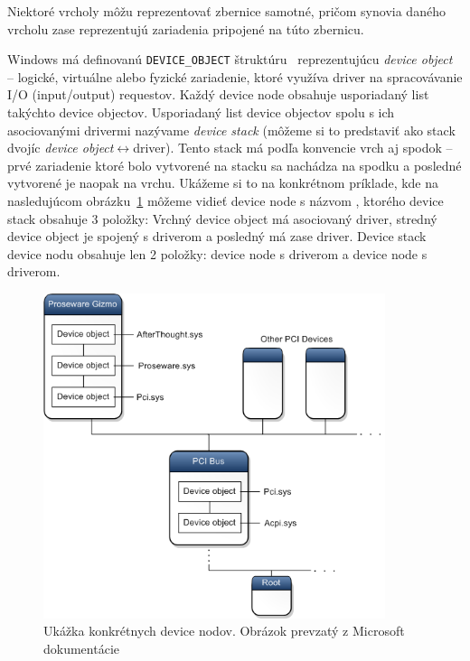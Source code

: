 Niektoré vrcholy môžu reprezentovať zbernice samotné, pričom synovia daného vrcholu zase reprezentujú zariadenia pripojené na túto zbernicu.

Windows má definovanú \texttt{DEVICE\_OBJECT} štruktúru~\cite{usb_msdn_device_object} reprezentujúcu \textit{device object} -- logické, virtuálne alebo fyzické zariadenie, ktoré využíva driver na spracovávanie I/O (input/output) requestov. Každý device node obsahuje usporiadaný list takýchto device objectov.  Usporiadaný list device objectov spolu s ich asociovanými drivermi nazývame \textit{device stack} (môžeme si to predstaviť ako stack dvojíc \textit{device object}$\leftrightarrow$driver). Tento stack má podľa konvencie vrch aj spodok -- prvé zariadenie ktoré bolo vytvorené na stacku sa nachádza na spodku a posledné vytvorené je naopak na vrchu. Ukážeme si to na konkrétnom príklade, kde na nasledujúcom obrázku~\ref{obr:kap2:device_node_diagram} môžeme vidieť device node s názvom , ktorého device stack obsahuje 3 položky: Vrchný device object má asociovaný  driver, stredný device object je spojený s driverom  a posledný má zase  driver. Device stack  device nodu obsahuje len 2 položky: device node s  driverom a device node s  driverom.

\begin{figure}[!htb]
	\centering
	\includegraphics[width=10cm]{img/kap02_device_node_diagram}
	\caption{Ukážka konkrétnych device nodov. Obrázok prevzatý z Microsoft dokumentácie~\cite{usb_msdn_device_node_stack}}
	\label{obr:kap2:device_node_diagram}
\end{figure}


